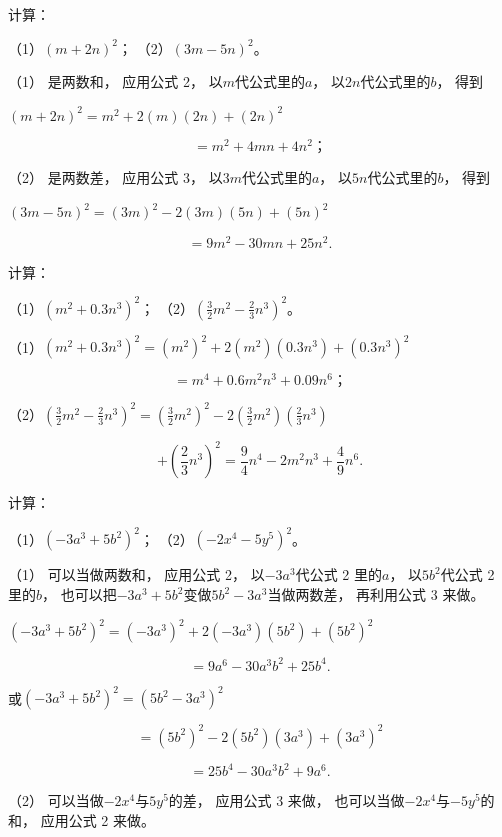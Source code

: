  计算：

（1）\((m + 2n)^{2}\)； （2）\((3m - 5n)^{2}\)。

 （1） 是两数和， 应用公式 2， 以\(m\)代公式里的\(a\)，
以\(2n\)代公式里的\(b\)， 得到

\((m + 2n)^{2} = m^{2} + 2(m)(2n) + (2n)^{2}\)

\[
= m ^{2} + 4 m n + 4 n ^{2}\text{；}
\]

 （2） 是两数差， 应用公式 3，
以\(3m\)代公式里的\(a\)， 以\(5n\)代公式里的\(b\)， 得到

\((3m - 5n)^{2} = (3m)^{2} - 2(3m)(5n) + (5n)^{2}\)

\[
= 9 m ^{2} - 30 m n + 25 n ^{2}.
\]

 计算：

（1）\((m^2 + 0.3n^3)^2\)；
（2）\(\left(\frac{3}{2} m^2 - \frac{2}{3} n^3\right)^2\)。

（1）\((m^2 + 0.3n^3)^2 = (m^2)^2 + 2(m^2)(0.3n^3) + (0.3n^3)^2\)

\[
= m ^{4} + 0.6 m ^{2} n ^{3} + 0.09 n ^{6}\text{；}
\]

（2）\(\left(\frac{3}{2} m^2 - \frac{2}{3} n^3\right)^2 = \left(\frac{3}{2} m^2\right)^2 - 2\left(\frac{3}{2} m^2\right)\left(\frac{2}{3} n^3\right)\)

\[
+ \left(\frac{2}{3} n ^{3}\right) ^{2} = \frac{9}{4} n ^{4} - 2 m ^{2} n ^{3} + \frac{4}{9} n ^{6}.
\]

 计算：

（1）\((-3a^{3} + 5b^{2})^{2}\)； （2）\((-2x^{4} - 5y^{5})^{2}\)。

 （1） 可以当做两数和， 应用公式 2，
以\(-3a^{3}\)代公式 2 里的\(a\)， 以\(5b^{2}\)代公式 2 里的\(b\)，
也可以把\(-3a^{3} + 5b^{2}\)变做\(5b^{2} - 3a^{3}\)当做两数差，
再利用公式 3 来做。

\((-3a^{3} + 5b^{2})^{2} = (-3a^{3})^{2} + 2(-3a^{3})(5b^{2}) + (5b^{2})^{2}\)

\[
= 9 a ^{6} - 30 a ^{3} b ^{2} + 25 b ^{4}.
\]

或\((-3a^{3} + 5b^{2})^{2} = (5b^{2} - 3a^{3})^{2}\)

\[
= (5 b ^{2}) ^{2} - 2 (5 b ^{2}) (3 a ^{3}) + (3 a ^{3}) ^{2}
\]

\[
= 25 b ^{4} - 30 a ^{3} b ^{2} + 9 a ^{6}.
\]

 （2） 可以当做\(-2x^{4}\)与\(5y^{5}\)的差， 应用公式 3
来做， 也可以当做\(-2x^{4}\)与\(-5y^{5}\)的和， 应用公式 2 来做。

